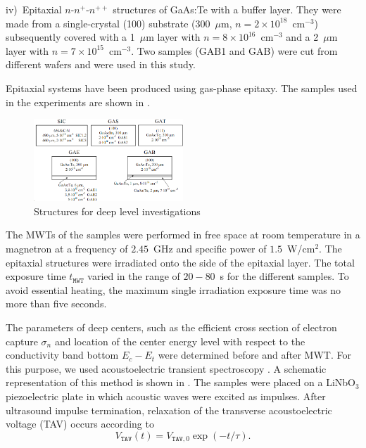 \documentclass[10pt]{iopart}
\begin{document}
\noindent
iv)~Epitaxial $n$-$n^+$-$n^{++}$ structures of GaAs:Te with a buffer layer.
 They were made from a single-crystal (100) substrate (300~$\mu$m, $n= 2\times10^{18}$~cm$^{-3}$)
  subsequently covered with a 1~$\mu$m layer with $n=8\times10^{16}$~cm$^{-3}$ and
  a 2~$\mu$m layer with $n=7\times10^{15}$~cm$^{-3}$.
  Two samples (GAB1 and GAB) were cut from different wafers and were used in this study.

Epitaxial systems have been produced using gas-phase epitaxy.
The samples used in the experiments are shown in .

\begin{figure}
\includegraphics[width=0.5\textwidth]{Fig1}
\caption{\label{figSamp_TAV}
Structures for deep level investigations
}%
\end{figure}

The MWTs of the samples were performed in free space at room temperature in a magnetron at a frequency of  $2.45$~GHz
and specific power of $1.5$~W/cm$^{2}$.
The epitaxial structures were irradiated onto the side of the epitaxial layer.
The total exposure time $t_\mathtt{MWT}$ varied in the range of $20-80$~s for the different samples.
To avoid essential heating, the maximum single irradiation exposure time was no more than  five seconds.


The parameters of deep centers, such as the efficient cross section of electron capture $\sigma_n$
and location of the center energy level with respect to the conductivity band bottom $E_c-E_t$ were determined before and after MWT.
For this purpose, we used acoustoelectric transient spectroscopy \cite{OstrovPAN,OlikhSSC,PANnewEn,OstrovskiiSST}.
A schematic representation of this method is shown in .
The samples were placed on a LiNbO$_3$ piezoelectric plate in which acoustic waves were excited as impulses.
After ultrasound impulse termination, relaxation of the transverse  acoustoelectric voltage (TAV) occurs according to
\begin{equation}\label{eqVtav}
  V_\mathtt{TAV}(t)=V_{\mathtt{TAV},0}\exp(-t/\tau).
\end{equation}
\end{document}
